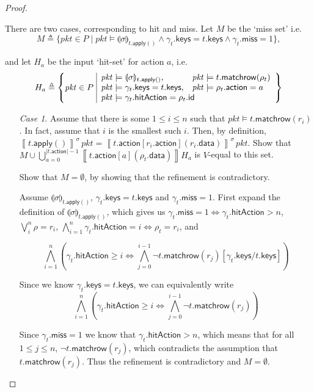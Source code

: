 \documentclass{article}
\newcommand{\pkt}{\mathit{pkt}}
\newcommand{\denote}[1]{\left\llbracket#1\right\rrbracket}
\newcommand{\action}{\mathsf{action}}
\newcommand{\keys}{\mathsf{keys}}
\newcommand{\data}{\mathsf{data}}
\newcommand{\id}{\mathsf{id}}
\newcommand{\hitAction}{\mathsf{hitAction}}
\newcommand{\miss}{\mathsf{miss}}
\newcommand{\apply}{\mathsf{apply}}
\newcommand{\state}[1]{\llparenthesis#1\rrparenthesis}
\newcommand{\matchrow}{\mathsf{matchrow}}
\begin{document}
\begin{proof}
\begin{enumerate}[align=left]
       There are two cases, corresponding to hit and miss. Let $M$ be the `miss
       set' i.e.
       \[M \triangleq \{\pkt \in P \mid \pkt \models \state\sigma_{t.\apply()} \wedge \gamma_t.\keys = t.\keys \wedge \gamma_t.\miss = 1 \},\]

       and let $H_a$ be the input `hit-set' for action $a$, i.e.
      \[ H_a \triangleq \left\{\pkt \in P\,\, \begin{array}{|ll}
        \pkt \models \state\sigma_{t.\apply()}, & \pkt \models t.\matchrow(\rho_t)\\
        \pkt \models \gamma_t.\keys = t.\keys, & \pkt \models \rho_t.\action = a \\
        \multicolumn{2}{|l}{\pkt \models \gamma_t.\hitAction = \rho_t.\id}
      \end{array}\right\}\]

    \begin{enumerate}
    \item[\textit{Case 1}.] Assume that there is some $1 \leq i \leq n$ such
      that $\pkt \models t.\matchrow(r_i)$. In fact, assume that $i$ is the
      smallest such $i$. Then, by definition, $\denote{t.\apply()}^\sigma\,\pkt
      = \denote{t.\action[r_i.\action](r_i.\data)}^\sigma\,\pkt$. Show that
      $M \cup \bigcup_{a=0}^{|t.\action|-1}\denote{t.\action[a](\rho_t.\data)} H_a$ is $V$-equal to this set.

      Show that $M = \emptyset$, by showing that the refinement is contradictory.

      Assume $\state\sigma_{t.\apply()}$, $\gamma_t.\keys = t.\keys$ and
      $\gamma_t.\miss = 1$. First expand the definition of
      $\state\sigma_{t.\apply()}$, which gives us $\gamma_t.\miss = 1
      \Leftrightarrow \gamma_t.\hitAction > n$, $\bigvee_{i}^n \rho = r_i$,
      $\bigwedge_{i=1}^n \gamma_t.\hitAction = i \Leftrightarrow \rho_t = r_i$,
      and

      \[\bigwedge_{i=1}^n \left(\gamma_t.\hitAction \geq i \Leftrightarrow \bigwedge_{j=0}^{i-1}\neg t.\matchrow(r_j)[\gamma_t.\keys/t.\keys]\right)\]

      Since we know $\gamma_t.\keys = t.\keys$, we can equivalently write
      \[\bigwedge_{i=1}^n \left(\gamma_t.\hitAction \geq i \Leftrightarrow \bigwedge_{j=0}^{i-1}\neg t.\matchrow(r_j)\right)\]

      Since $\gamma_t.\miss = 1$ we know that $\gamma_t.\hitAction > n$, which
      means that for all $1 \leq j \leq n$, $\neg t.\matchrow(r_j)$, which
      contradicts the assumption that $t.\matchrow(r_j)$. Thus the refinement is
      contradictory and $M = \emptyset$. \hfill \checkmark


\end{enumerate}
\end{enumerate}
\end{proof}
\end{document}

